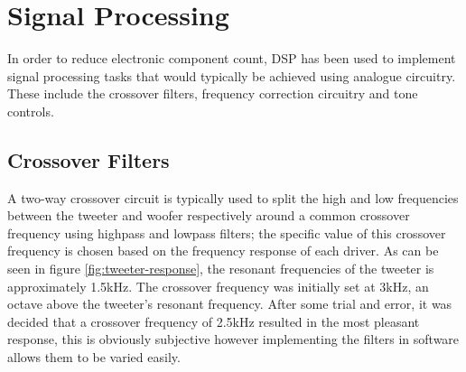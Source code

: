 \documentclass[main.tex]{subfiles}
\begin{document}
\section{Signal Processing}
In order to reduce electronic component count, DSP has been used to implement signal processing tasks that would typically be achieved using analogue circuitry.
These include the crossover filters, frequency correction circuitry and tone controls.
\subsection{Crossover Filters}
A two-way crossover circuit is typically used to split the high and low frequencies between the tweeter and woofer respectively around a common crossover frequency using highpass and lowpass filters;
the specific value of this crossover frequency is chosen based on the frequency response of each driver.
As can be seen in figure \ref{fig:tweeter-response}, the resonant frequencies of the tweeter is approximately 1.5kHz.
The crossover frequency was initially set at 3kHz, an octave above the tweeter's resonant frequency.
After some trial and error, it was decided that a crossover frequency of 2.5kHz resulted in the most pleasant response, this is obviously subjective however implementing the filters in software allows them to be varied easily.
\end{document}
